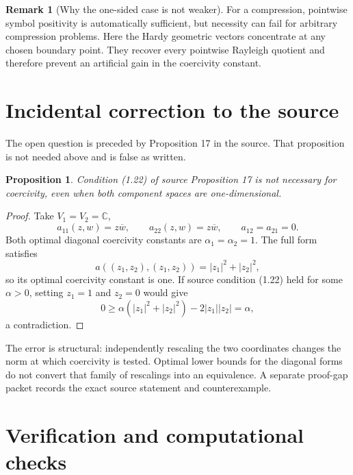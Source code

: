 \documentclass[11pt]{article}
\newtheorem{proposition}[theorem]{Proposition}
\theoremstyle{definition}
\newtheorem{remark}[theorem]{Remark}
\begin{document}
\begin{remark}[Why the one-sided case is not weaker]
For a compression, pointwise symbol positivity is automatically sufficient,
but necessity can fail for arbitrary compression problems.  Here the Hardy
geometric vectors concentrate at any chosen boundary point.  They recover
every pointwise Rayleigh quotient and therefore prevent an artificial gain in
the coercivity constant.
\end{remark}

\section{Incidental correction to the source}

The open question is preceded by Proposition 17 in the source.  That
proposition is not needed above and is false as written.

\begin{proposition}\label{prop:counterexample}
Condition (1.22) of source Proposition 17 is not necessary for coercivity,
even when both component spaces are one-dimensional.
\end{proposition}

\begin{proof}
Take $V_1=V_2=\mathbb C$,
\[
 a_{11}(z,w)=z\overline w,\qquad
 a_{22}(z,w)=z\overline w,\qquad a_{12}=a_{21}=0.
\]
Both optimal diagonal coercivity constants are $\alpha_1=\alpha_2=1$.  The
full form satisfies
\[
a((z_1,z_2),(z_1,z_2))=|z_1|^2+|z_2|^2,
\]
so its optimal coercivity constant is one.  If source condition (1.22) held
for some $\alpha>0$, setting
$z_1=1$ and $z_2=0$ would give
\[
 0\ge\alpha(|z_1|^2+|z_2|^2)-2|z_1||z_2|=\alpha,
\]
a contradiction.
\end{proof}

The error is structural: independently rescaling the two coordinates changes
the norm at which coercivity is tested.  Optimal lower bounds for the diagonal
forms do not convert that family of rescalings into an equivalence.  A separate
proof-gap packet records the exact source statement and counterexample.

\section{Verification and computational checks}
\end{document}
